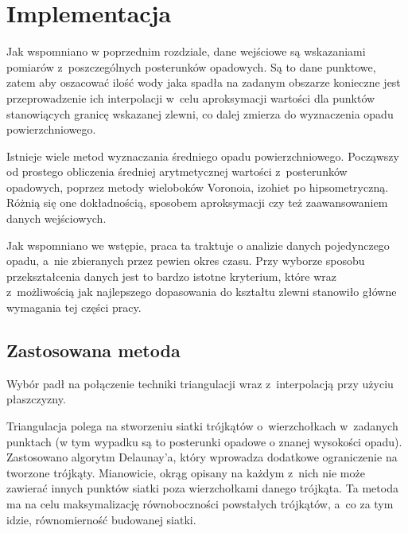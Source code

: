 \chapter{Implementacja}
Jak wspomniano w poprzednim rozdziale, dane wejściowe są wskazaniami pomiarów z~poszczególnych posterunków opadowych. Są to dane punktowe, zatem aby oszacować ilość wody jaka spadła na zadanym obszarze konieczne jest przeprowadzenie ich interpolacji w~celu aproksymacji wartości dla punktów stanowiących granicę wskazanej zlewni, co dalej zmierza do wyznaczenia opadu powierzchniowego.

Istnieje wiele metod wyznaczania średniego opadu powierzchniowego. Począwszy od prostego obliczenia średniej arytmetycznej wartości z~posterunków opadowych, poprzez metody wieloboków Voronoia, izohiet po hipsometryczną. Różnią się one dokładnością, sposobem aproksymacji czy też zaawansowaniem danych wejściowych.

Jak wspomniano we wstępie, praca ta traktuje o analizie danych pojedynczego opadu, a~nie zbieranych przez pewien okres czasu. Przy wyborze sposobu przekształcenia danych jest to bardzo istotne kryterium, które wraz z~możliwością jak najlepszego dopasowania do kształtu zlewni stanowiło główne wymagania tej części pracy.


\section{Zastosowana metoda}
Wybór padł na połączenie techniki triangulacji wraz z~interpolacją przy użyciu płaszczyzny.

Triangulacja polega na stworzeniu siatki trójkątów o~wierzchołkach w~zadanych punktach (w tym wypadku są to posterunki opadowe o znanej wysokości opadu). Zastosowano algorytm Delaunay'a, który wprowadza dodatkowe ograniczenie na tworzone trójkąty. Mianowicie, okrąg opisany na każdym z~nich nie może zawierać innych punktów siatki poza wierzchołkami danego trójkąta. Ta metoda ma na celu maksymalizację równoboczności powstałych trójkątów, a~co za tym idzie, równomierność budowanej siatki.

